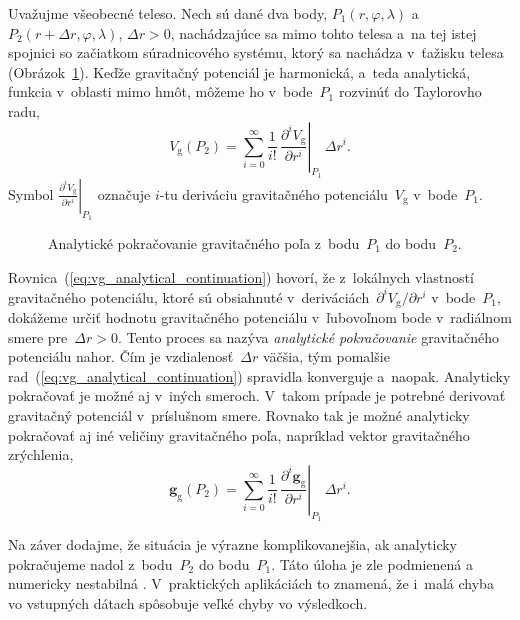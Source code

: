 \documentclass[a4paper, 12pt]{book}
\newcommand{\gidx}{\mathrm g}
\let\vec\mathbf
\begin{document}
Uvažujme všeobecné teleso.  Nech sú dané dva body,
$P_1(r, \varphi, \lambda)$ a~$P_2(r + \Delta r, \varphi, \lambda)$, $\Delta
r > 0$, nachádzajúce sa mimo tohto telesa a~na tej istej spojnici so začiatkom
súradnicového systému, ktorý sa nachádza v~ťažisku telesa
(Obrázok~\ref{fig:analytical_continuation}).  Keďže gravitačný potenciál je 
harmonická, a~teda analytická, funkcia v~oblasti mimo hmôt, môžeme ho 
v~bode~$P_1$ rozvinúť do Taylorovho radu,
%
\begin{equation}
\label{eq:vg_analytical_continuation}
V_\gidx(P_2) = \sum_{i = 0}^\infty \frac{1}{i!} \, \left.\frac{\partial^i
V_\gidx}{\partial r^i}\right|_{P_1} \, \Delta r^i{.}
\end{equation}
%
Symbol $\left.\frac{\partial^i V_\gidx}{\partial r^i} \right|_{P_1}$ označuje 
$i$-tu deriváciu gravitačného potenciálu~$V_\gidx$ v~bode~$P_1$.

\begin{figure}

\centering

\caption{Analytické pokračovanie gravitačného poľa z~bodu~$P_1$ do bodu~$P_2$.}
\label{fig:analytical_continuation}
\end{figure}

Rovnica~(\ref{eq:vg_analytical_continuation}) hovorí, že z~lokálnych vlastností 
gravitačného potenciálu, ktoré sú obsiahnuté v~deriváciách~$\partial^i V_\gidx 
\slash \partial r^i$ v~bode~$P_1$, dokážeme určiť hodnotu gravitačného 
potenciálu v~ľubovoľnom bode v~radiálnom smere pre~$\Delta r > 0$.  Tento 
proces sa nazýva \emph{analytické pokračovanie} gravitačného potenciálu nahor.  
Čím je vzdialenosť~$\Delta r$ väčšia, tým pomalšie 
rad~(\ref{eq:vg_analytical_continuation}) spravidla konverguje a~naopak.  
Analyticky pokračovať je možné aj v~iných smeroch.  V~takom prípade je potrebné 
derivovať gravitačný potenciál v~príslušnom smere.  Rovnako tak je možné 
analyticky pokračovať aj iné veličiny gravitačného poľa, napríklad vektor 
gravitačného zrýchlenia,
%
\begin{equation}
\label{eq:gg_analytical_continuation}
\vec g_\gidx(P_2) = \sum_{i = 0}^{\infty} \frac{1}{i!} \, 
\left.\frac{\partial^i \vec
g_\gidx}{\partial r^i}\right|_{P_1} \, \Delta r^i{.}
\end{equation}

Na záver dodajme, že situácia je výrazne komplikovanejšia, ak analyticky 
pokračujeme nadol z~bodu~$P_2$ do bodu~$P_1$.  Táto úloha je zle podmienená 
a numericky nestabilná \parencite{SansoGeodeticBoundaryValueProblem}.  
V~praktických aplikáciách to znamená, že i~malá chyba vo vstupných dátach 
spôsobuje veľké chyby vo výsledkoch.
\end{document}
